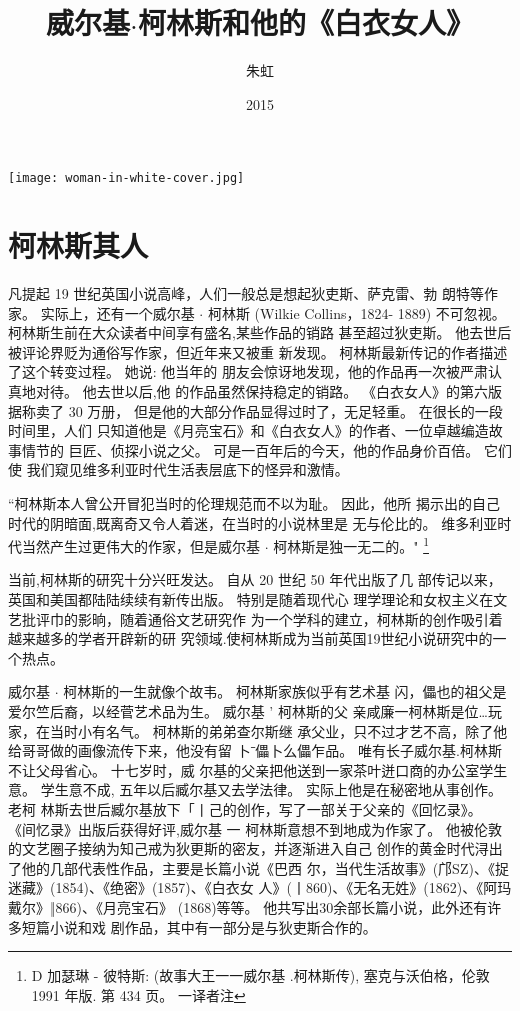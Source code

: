 \documentclass[portrait,a4paper]{article}
\title{威尔基$\cdot$柯林斯和他的《白衣女人》}
\author{朱虹}
\date{2015}
\begin{document}
\maketitle

\texttt{[image: woman-in-white-cover.jpg]}

\section{柯林斯其人}

凡提起 19 世纪英国小说高峰，人们一般总是想起狄吏斯、萨克雷、勃
朗特等作家。 实际上，还有一个威尔基 $\cdot$ 柯林斯 (Wilkie Collins，1824-
1889) 不可忽视。 柯林斯生前在大众读者中间享有盛名,某些作品的销路
甚至超过狄吏斯。 他去世后被评论界贬为通俗写作家，但近年来又被重
新发现。 柯林斯最新传记的作者描述了这个转变过程。 她说: 他当年的
朋友会惊讶地发现，他的作品再一次被严肃认真地对待。 他去世以后,他
的作品虽然保持稳定的销路。 《白衣女人》的第六版据称卖了 30 万册，
但是他的大部分作品显得过时了，无足轻重。 在很长的一段时间里，人们
只知道他是《月亮宝石》和《白衣女人》的作者、一位卓越编造故事情节的
巨匠、侦探小说之父。 可是一百年后的今天，他的作品身价百倍。 它们使
我们窥见维多利亚时代生活表层底下的怪异和激情。

``柯林斯本人曾公开冒犯当时的伦理规范而不以为耻。 因此，他所
揭示出的自己时代的阴暗面,既离奇又令人着迷，在当时的小说林里是
无与伦比的。 维多利亚时代当然产生过更伟大的作家，但是威尔基 $\cdot$
柯林斯是独一无二的。" \footnote{D 加瑟琳 - 彼特斯: (故事大王一一威尔基 .柯林斯传), 塞克与沃伯格，伦敦 1991 年版. 第 434 页。 一译者注}

当前,柯林斯的研究十分兴旺发达。 自从 20 世纪 50 年代出版了几
部传记以来，英国和美国都陆陆续续有新传出版。 特别是随着现代心
理学理论和女权主义在文艺批评巾的影晌，随着通俗文艺研究作
为一个学科的建立，柯林斯的创作吸引着越来越多的学者开辟新的研
究领域.使柯林斯成为当前英国19世纪小说研究中的一个热点。

威尔基 $\cdot$ 柯林斯的一生就像个故韦。 柯林斯家族似乎有艺术基
闪，儡也的祖父是爱尔竺后裔，以经菅艺术品为生。 威尔基 ' 柯林斯的父
亲咸廉一柯林斯是位…玩家，在当时小有名气。 柯林斯的弟弟查尔斯继
承父业，只不过才艺不高，除了他给哥哥做的画像流传下来，他没有留
卜ˉ儡卜么儡乍品。 唯有长子威尔基.柯林斯不让父母省心。 十七岁时，威
尔基的父亲把他送到一家茶叶迸口商的办公室学生意。 学生意不成,
五年以后臧尔基又去学法律。 实际上他是在秘密地从事创作。 老柯
林斯去世后臧尔基放下「丨己的创作，写了一部关于父亲的《回忆录》。
《间忆录》出版后获得好评,威尔基 一 柯林斯意想不到地成为作家了。
他被伦敦的文艺圈子接纳为知己戒为狄更斯的密友，并逐渐进入自己
创作的黄金时代浔出了他的几部代表性作品，主要是长篇小说《巴西
尔，当代生活故事》(邝SZ)、《捉迷藏》(1854)、《绝密》(1857)、《白衣女
人》(丨860)、《无名无姓》(1862)、《阿玛戴尔》‖866)、《月亮宝石》
(1868)等等。 他共写出30余部长篇小说，此外还有许多短篇小说和戏
剧作品，其中有一部分是与狄吏斯合作的。
\end{document}
